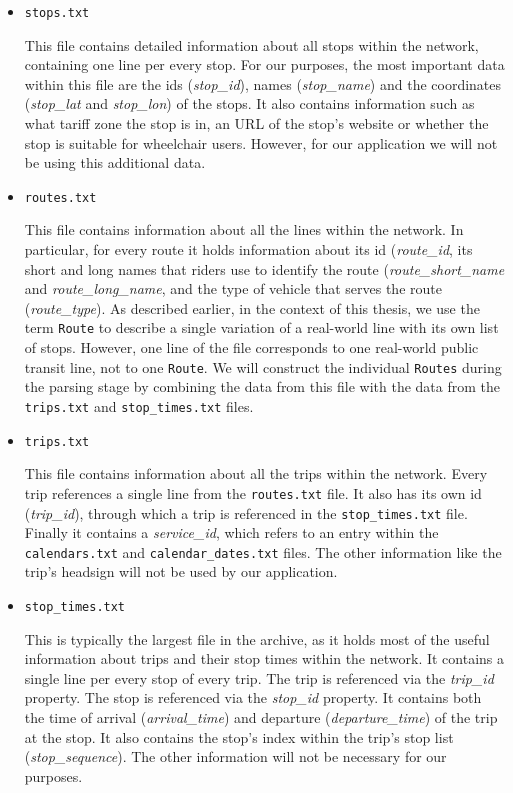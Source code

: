 \begin{itemize}
    \item \texttt{stops.txt}
    
    This file contains detailed information about all stops within the network, containing one line per every stop. For our purposes, the most important data within this file are the ids (\textit{stop\_id}), names (\textit{stop\_name}) and the coordinates (\textit{stop\_lat} and \textit{stop\_lon}) of the stops. It also contains information such as what tariff zone the stop is in, an URL of the stop's website or whether the stop is suitable for wheelchair users. However, for our application we will not be using this additional data.

    \item \texttt{routes.txt}

    This file contains information about all the lines within the network. In particular, for every route it holds information about its id (\textit{route\_id}, its short and long names that riders use to identify the route (\textit{route\_short\_name} and \textit{route\_long\_name}, and the type of vehicle that serves the route (\textit{route\_type}). As described earlier, in the context of this thesis, we use the term \texttt{Route} to describe a single variation of a real-world line with its own list of stops. However, one line of the file corresponds to one real-world public transit line, not to one \texttt{Route}. We will construct the individual \texttt{Routes} during the parsing stage by combining the data from this file with the data from the \texttt{trips.txt} and \texttt{stop\_times.txt} files.

    \item \texttt{trips.txt}

    This file contains information about all the trips within the network. Every trip references a single line from the \texttt{routes.txt} file. It also has its own id (\textit{trip\_id}), through which a trip is referenced in the \texttt{stop\_times.txt} file. Finally it contains a \textit{service\_id}, which refers to an entry within the \texttt{calendars.txt} and \texttt{calendar\_dates.txt} files. The other information like the trip's headsign will not be used by our application.

    \item \texttt{stop\_times.txt}

    This is typically the largest file in the archive, as it holds most of the useful information about trips and their stop times within the network. It contains a single line per every stop of every trip. The trip is referenced via the \textit{trip\_id} property. The stop is referenced via the \textit{stop\_id} property. It contains both the time of arrival (\textit{arrival\_time}) and departure (\textit{departure\_time}) of the trip at the stop. It also contains the stop's index within the trip's stop list (\textit{stop\_sequence}). The other information will not be necessary for our purposes.


\end{itemize}
